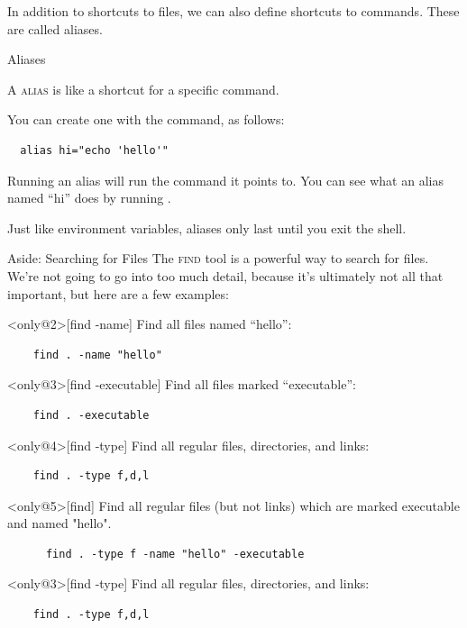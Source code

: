 In addition to shortcuts to files, we can also define shortcuts to commands.
These are called aliases.

\begin{frame}[fragile]{Aliases}
  \begin{definition}[alias]
    A \textsc{alias} is like a shortcut for a specific command.
  \end{definition}

  \pause

  You can create one with the  command, as follows:
  \begin{verbatim}
  alias hi="echo 'hello'"
  \end{verbatim}

  \pause

  Running an alias will run the command it points to.  You can see what an
  alias named \enquote{hi} does by running .
\end{frame}

Just like environment variables, aliases only last until you exit the shell.

\begin{frame}[fragile]{Aside: Searching for Files}
  The \textsc{find} tool is a powerful way to search for files.
   {
    We're not going to go into too much detail, because it's ultimately not all that
    important, but here are a few examples:
  }
  \pause
  \begin{example}<only@2>[find -name]
    Find all files named \enquote{hello}:
    \begin{verbatim}
    find . -name "hello"
    \end{verbatim}
  \end{example}
  \pause
  \begin{example}<only@3>[find -executable]
    Find all files marked \enquote{executable}:
    \begin{verbatim}
    find . -executable
    \end{verbatim}
  \end{example}
  \begin{example}<only@4>[find -type]
    Find all regular files, directories, and links:
    \begin{verbatim}
    find . -type f,d,l
    \end{verbatim}
  \end{example}
  \pause
  \begin{example}<only@5>[find]
    Find all regular files (but not links) which are marked executable and named "hello".
    \begin{verbatim}
      find . -type f -name "hello" -executable
    \end{verbatim}
  \end{example}
  \pause
  \begin{example}<only@3>[find -type]
    Find all regular files, directories, and links:
    \begin{verbatim}
    find . -type f,d,l
    \end{verbatim}
  \end{example}
\end{frame}

